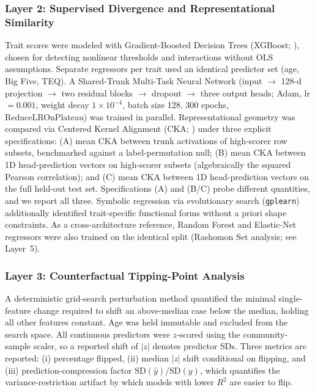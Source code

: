 \documentclass[11pt,twocolumn]{article}
\begin{document}
\subsubsection{Layer 2: Supervised Divergence and Representational Similarity}

Trait scores were modeled with Gradient-Boosted Decision Trees (XGBoost; \citealp{chen2016}), chosen for detecting nonlinear thresholds and interactions without OLS assumptions. Separate regressors per trait used an identical predictor set (age, Big Five, TEQ). A Shared-Trunk Multi-Task Neural Network (input $\rightarrow$ 128-d projection $\rightarrow$ two residual blocks $\rightarrow$ dropout $\rightarrow$ three output heads; Adam, lr $= 0.001$, weight decay $1\times10^{-4}$, batch size 128, 300 epochs, ReduceLROnPlateau) was trained in parallel. Representational geometry was compared via Centered Kernel Alignment (CKA; \citealp{kornblith2019}) under three explicit specifications: (A) mean CKA between trunk activations of high-scorer row subsets, benchmarked against a label-permutation null; (B) mean CKA between 1D head-prediction vectors on high-scorer subsets (algebraically the squared Pearson correlation); and (C) mean CKA between 1D head-prediction vectors on the full held-out test set. Specifications (A) and (B/C) probe different quantities, and we report all three. Symbolic regression via evolutionary search (\texttt{gplearn}) additionally identified trait-specific functional forms without a priori shape constraints. As a cross-architecture reference, Random Forest and Elastic-Net regressors were also trained on the identical split (Rashomon Set analysis; see Layer~5).

\subsubsection{Layer 3: Counterfactual Tipping-Point Analysis}

A deterministic grid-search perturbation method \citep{wachter2017} quantified the minimal single-feature change required to shift an above-median case below the median, holding all other features constant. Age was held immutable and excluded from the search space. All continuous predictors were $z$-scored using the community-sample scaler, so a reported shift of $|z|$ denotes predictor SDs. Three metrics are reported: (i) percentage flipped, (ii) median $|z|$ shift conditional on flipping, and (iii) prediction-compression factor $\text{SD}(\hat{y}) / \text{SD}(y)$, which quantifies the variance-restriction artifact by which models with lower $R^2$ are easier to flip.
\end{document}
